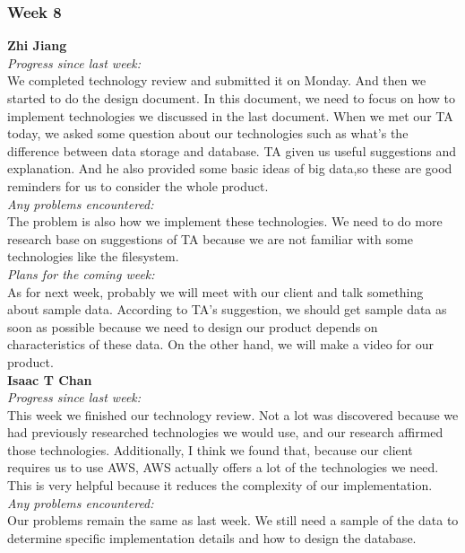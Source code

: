 \subsubsection{Week 8}

\textbf{Zhi Jiang}\\
\noindent\textit{Progress since last week:}\\
We completed technology review and submitted it on Monday. And then we started to do the design document. In this document, we need to focus on how to implement technologies we discussed in the last document. When we met our TA today, we asked some question about our technologies such as what's the difference between data storage and database. TA given us useful suggestions and explanation. And he also provided some basic ideas of big data,so these are good reminders for us to consider the whole product.\\

\noindent\textit{Any problems encountered:}\\
The problem is also how we implement these technologies. We need to do more research base on suggestions of TA because we are not familiar with some technologies like the filesystem.\\

\noindent\textit{Plans for the coming week:}\\
 As for next week, probably we will meet with our client and talk something about sample data. According to TA's suggestion, we should get sample data as soon as possible because we need to design our product depends on characteristics of these data. On the other hand, we will make a video for our product.\\

\noindent\textbf{Isaac T Chan}\\
\noindent\textit{Progress since last week:}\\
This week we finished our technology review. Not a lot was discovered because we had previously researched technologies we would use, and our research affirmed those technologies. Additionally, I think we found that, because our client requires us to use AWS, AWS actually offers a lot of the technologies we need. This is very helpful because it reduces the complexity of our implementation.\\

\noindent\textit{Any problems encountered:}\\
Our problems remain the same as last week. We still need a sample of the data to determine specific implementation details and how to design the database.\\

